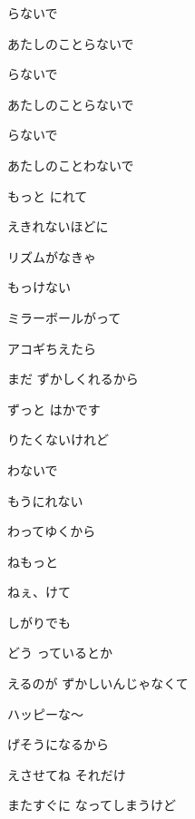 \documentclass[a4paper,tate,twocolumn,12pt]{ltjtarticle}
\begin{document}
\begin{flushleft}
\begin{minipage}{\linewidth}
らないで

あたしのことらないで

らないで

あたしのことらないで

らないで

あたしのことわないで
\end{minipage}

\vspace{2em}

\noindent\begin{minipage}{\linewidth}
もっと にれて

えきれないほどに

リズムがなきゃ

もっけない

ミラーボールがって

アコギちえたら

まだ ずかしくれるから

ずっと はかです

りたくないけれど

わないで

もうにれない

わってゆくから

ねもっと

ねぇ、けて

しがりでも
\end{minipage}

\vspace{2em}

\noindent\begin{minipage}{\linewidth}
どう っているとか

えるのが ずかしいんじゃなくて

ハッピーな〜

げそうになるから

えさせてね それだけ

またすぐに なってしまうけど
\end{minipage}


\end{flushleft}
\end{document}
